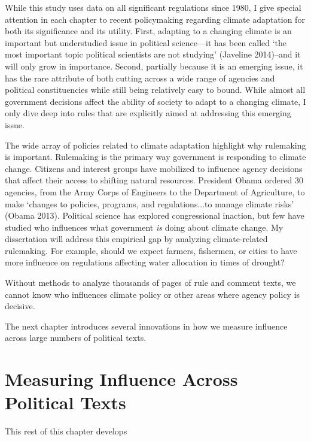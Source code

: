While this study uses data on all significant regulations since 1980, I give special attention in each chapter to recent policymaking regarding climate adaptation for both its significance and its utility. First, adapting to a changing climate is an important but understudied issue in political science---it has been called `the most important topic political scientists are not studying' (Javeline 2014)--and it will only grow in importance. Second, partially because it is an emerging issue, it has the rare attribute of both cutting across a wide range of agencies and political constituencies while still being relatively easy to bound. While almost all government decisions affect the ability of society to adapt to a changing climate, I only dive deep into rules that are explicitly aimed at addressing this emerging issue.

The wide array of policies related to climate adaptation highlight why rulemaking is important. Rulemaking is the primary way government is responding to climate change. Citizens and interest groups have mobilized to influence agency decisions that affect their access to shifting natural resources. President Obama ordered 30 agencies, from the Army Corps of Engineers to the Department of Agriculture, to make `changes to policies, programs, and regulations...to manage climate risks' (Obama 2013). Political science has explored congressional inaction, but few have studied who influences what government \textit{is} doing about climate change. My dissertation will address this empirical gap by analyzing climate-related rulemaking. For example, should we expect farmers, fishermen, or cities to have more influence on regulations affecting water allocation in times of drought? %

Without methods to analyze thousands of pages of rule and comment texts, we cannot know who influences climate policy or other areas where agency policy is decisive. 

 The next chapter introduces several innovations in how we measure influence across large numbers of political texts.

\section{Measuring Influence Across Political Texts}




This rest of this chapter develops 

